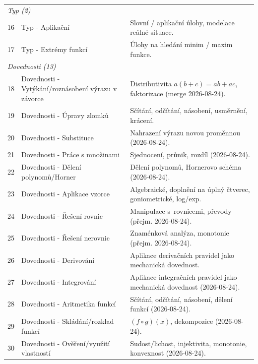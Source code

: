 \documentclass[11pt,a4paper]{article}
\begin{document}
\begin{longtable}{p{1cm}p{6cm}p{8.5cm}}
  \multicolumn{3}{l}{\textit{Typ (2)}} \\[2pt]
  16 & Typ - Aplikační                         & Slovní / aplikační úlohy, modelace reálné situace. \\
  17 & Typ - Extrémy funkcí                    & Úlohy na hledání minim / maxim funkce. \\[4pt]

  \multicolumn{3}{l}{\textit{Dovednosti (13)}} \\[2pt]
  18 & Dovednosti - Vytýkání/roznásobení výrazu v závorce & Distributivita $a(b+c)=ab+ac$, faktorizace (merge 2026-08-24). \\
  19 & Dovednosti - Úpravy zlomků              & Sčítání, odčítání, násobení, usměrnění, krácení. \\
  20 & Dovednosti - Substituce                 & Nahrazení výrazu novou proměnnou (2026-08-24). \\
  21 & Dovednosti - Práce s množinami          & Sjednocení, průnik, rozdíl (2026-08-24). \\
  22 & Dovednosti - Dělení polynomů/Horner     & Dělení polynomů, Hornerovo schéma (2026-08-24). \\
  23 & Dovednosti - Aplikace vzorce            & Algebraické, doplnění na úplný čtverec, goniometrické, log/exp. \\
  24 & Dovednosti - Řešení rovnic              & Manipulace s~rovnicemi, převody (přejm. 2026-08-24). \\
  25 & Dovednosti - Řešení nerovnic            & Znaménková analýza, mono\-tonie (přejm. 2026-08-24). \\
  26 & Dovednosti - Derivování                 & Aplikace derivačních pravidel jako mechanická dovednost. \\
  27 & Dovednosti - Integrování                & Aplikace integračních pravidel jako mechanická dovednost (2026-08-24). \\
  28 & Dovednosti - Aritmetika funkcí          & Sčítání, odčítání, násobení, dělení funkcí (2026-08-24). \\
  29 & Dovednosti - Skládání/rozklad funkcí    & $(f \circ g)(x)$, dekompozice (2026-08-24). \\
  30 & Dovednosti - Ověření/využití vlastností & Sudost/lichost, injektivita, monotonie, konvexnost (2026-08-24). \\[4pt]


\end{longtable}
\end{document}
